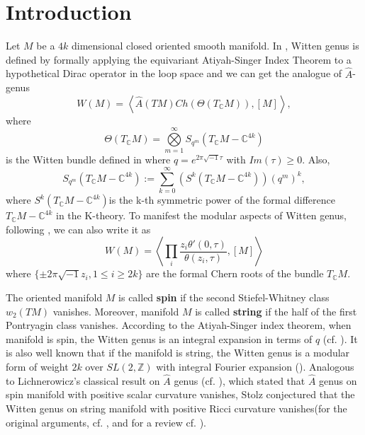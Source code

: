 \documentclass[11pt]{article}
\newcommand{\cplx}{\mathbb C}
\begin{document}
\section{Introduction}
Let $M$ be a $4k$ dimensional closed oriented smooth manifold. In \cite{witten1988index}, Witten genus is defined by formally applying the equivariant Atiyah-Singer Index Theorem to a hypothetical Dirac operator in the loop space and we can get the analogue of $\hat{A}$-genus
\begin{equation*}
	W(M)=\left\langle\hat{A}(TM) Ch(\Theta(T_\mathbb{C}M)),[M] \right\rangle,
\end{equation*}
where 
\begin{equation*}
	\Theta(T_{\mathbb{C}}M)=\underset{m=1}{\overset{\infty}{\bigotimes}} S_{q^{m}}(T_{\mathbb{C}}M-\mathbb{C}^{4k})
\end{equation*}
is the Witten bundle defined in \cite{witten1988index} where $q=e^{2\pi\sqrt{-1} \tau}$ with $Im(\tau)\geq 0$. Also, 
		\begin{equation*}
			S_{q^m} (T_{\mathbb{C}}M-\mathbb{C}^{4k}) :=\sum^\infty_{k=0}(S^k (T_{\mathbb{C}}M-\mathbb{C}^{4k}))(q^m)^k,
		\end{equation*} 
where $S^k(T_\cplx M-\cplx^{4k})$is the k-th symmetric power of the formal difference $T_\cplx M-\cplx^{4k}$ in the K-theory.
To manifest the modular aspects of Witten genus, following \cite{liu1996elliptic}, we can also write it as
\begin{equation*}
	W(M)=\left\langle\prod_{i}\frac{z_i \theta'(0,\tau)}{\theta(z_i,\tau)},[M]\right\rangle
\end{equation*}
where $\{\pm 2\pi\sqrt{-1}z_i,1\leq i\geq 2k\}$ are the formal Chern roots of the bundle $T_{\mathbb{C}}M$.

The oriented manifold $M$ is called \textbf{spin} if the  second Stiefel-Whitney class $w_2(TM)$ vanishes. Moreover, manifold $M$ is called \textbf{string} if the half of the first Pontryagin class vanishes. According to the Atiyah-Singer index theorem, when manifold is spin, the Witten genus is an integral expansion in terms of $q$ (cf. \cite{hirzebruch1992manifolds}). It is also well known that if the manifold is string, the Witten genus is a modular form of weight $2k$ over $SL(2,\mathbb{Z})$ with integral Fourier expansion (\cite{zagier1988note}).
Analogous to Lichnerowicz's classical result on $\hat{A}$ genus (cf. \cite{lawson2016spin}), which stated that $\hat{A}$ genus on spin manifold with positive scalar curvature vanishes, Stolz conjectured that the Witten genus on string manifold with positive Ricci curvature vanishes(for the original arguments, cf. \cite{stolz1996conjecture}, and for a review cf. \cite{dessai2009some}). 
\end{document}
